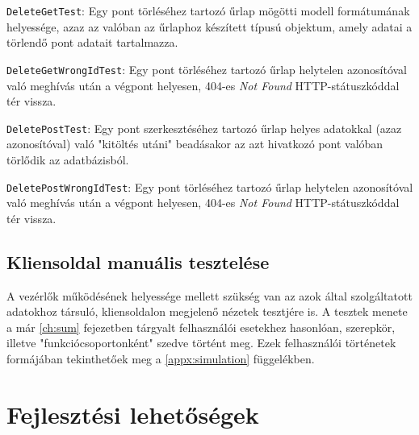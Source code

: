 \begin{compactitem}
	\item \texttt{DeleteGetTest}: Egy pont törléséhez tartozó űrlap mögötti modell formátumának helyessége, azaz az valóban az űrlaphoz készített típusú objektum, amely adatai a törlendő pont adatait tartalmazza.
	\item \texttt{DeleteGetWrongIdTest}: Egy pont törléséhez tartozó űrlap helytelen azonosítóval való meghívás után a végpont helyesen, 404-es \textit{Not Found} HTTP-státuszkóddal tér vissza.
	\item \texttt{DeletePostTest}: Egy pont szerkesztéséhez tartozó űrlap helyes adatokkal (azaz azonosítóval) való "kitöltés utáni" beadásakor az azt hivatkozó pont valóban törlődik az adatbázisból.
	\item \texttt{DeletePostWrongIdTest}: Egy pont törléséhez tartozó űrlap helytelen azonosítóval való meghívás után a végpont helyesen, 404-es \textit{Not Found} HTTP-státuszkóddal tér vissza.
\end{compactitem}

\subsection{Kliensoldal manuális tesztelése}
\label{subsec:manual_test}

A vezérlők működésének helyessége mellett szükség van az azok által szolgáltatott adatokhoz társuló, kliensoldalon megjelenő nézetek tesztjére is. A tesztek menete a már \ref{ch:sum} fejezetben tárgyalt felhasználói esetekhez hasonlóan, szerepkör, illetve "funkciócsoportonként" szedve történt meg. Ezek felhasználói történetek formájában tekinthetőek meg a \ref{appx:simulation} függelékben.

\section{Fejlesztési lehetőségek}

